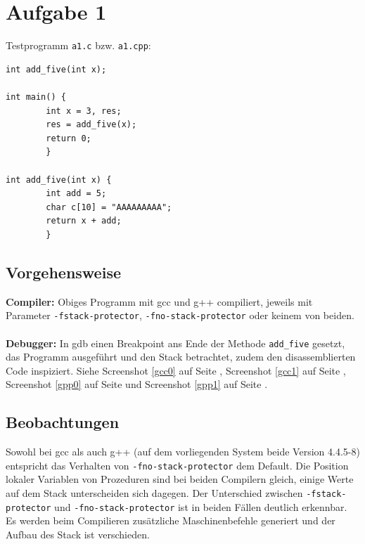 \documentclass[11pt,a4paper]{article}
\begin{document}
\lstset{language=C}


\clearpage
\setcounter{page}{1}
\tableofcontents

\section{Aufgabe 1}
\setcounter{page}{1}
Testprogramm \texttt{a1.c} bzw. \texttt{a1.cpp}:
\begin{lstlisting}[frame=single]
int add_five(int x);

int main() {
        int x = 3, res;
        res = add_five(x);
        return 0;
        }

int add_five(int x) {
        int add = 5;
        char c[10] = "AAAAAAAAA";
        return x + add;
        }
\end{lstlisting}
\subsection{Vorgehensweise}
\textbf{Compiler:} Obiges Programm mit gcc und g++ compiliert, jeweils mit Parameter \texttt{-fstack-protector}, \texttt{-fno-stack-protector} oder keinem von beiden.\\
\\
\textbf{Debugger:} In gdb einen Breakpoint ans Ende der Methode \texttt{add\_five} gesetzt, das Programm ausgeführt und den Stack betrachtet, zudem den disassemblierten Code inspiziert. Siehe Screenshot \ref{gcc0} auf Seite \pageref{gcc0}, Screenshot \ref{gcc1} auf Seite \pageref{gcc1}, Screenshot \ref{gpp0} auf Seite \pageref{gpp0} und Screenshot \ref{gpp1} auf Seite \pageref{gpp1}.
\subsection{Beobachtungen}
Sowohl bei gcc als auch g++ (auf dem vorliegenden System beide Version 4.4.5-8) entspricht das Verhalten von \texttt{-fno-stack-protector} dem Default. Die Position lokaler Variablen von Prozeduren sind bei beiden Compilern gleich, einige Werte auf dem Stack unterscheiden sich dagegen. Der Unterschied zwischen \texttt{-fstack-protector} und \texttt{-fno-stack-protector} ist in beiden Fällen deutlich erkennbar. Es werden beim Compilieren zusätzliche Maschinenbefehle generiert und der Aufbau des Stack ist verschieden.
\end{document}
